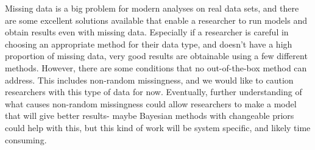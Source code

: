 Missing data is a big problem for modern analyses on real data sets, and there are some excellent solutions available that enable a researcher to run models and obtain results even with missing data. Especially if a researcher is careful in choosing an appropriate method for their data type, and doesn't have a high proportion of missing data, very good results are obtainable using a few different methods. However, there are some conditions that no out-of-the-box method can address. This includes non-random missingness, and we would like to caution researchers with this type of data for now. Eventually, further understanding of what causes non-random missingness could allow researchers to make a model that will give better results- maybe Bayesian methods with changeable priors could help with this, but this kind of work will be system specific, and likely time consuming. 
